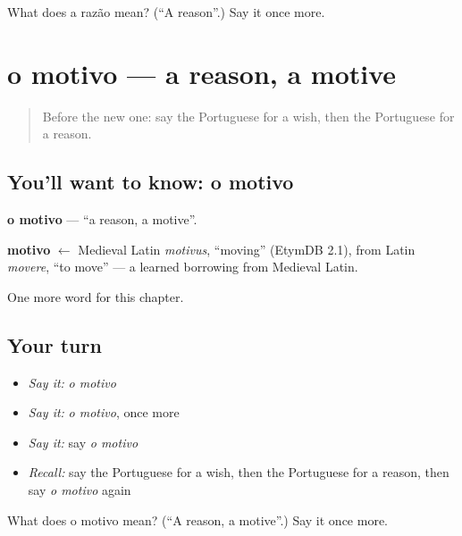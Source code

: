 \begin{tcolorbox}[breakable,colback=teal!4,colframe=teal!35!black,title={Before you move on}]
What does a razão mean? (\textquotedblleft{}A reason\textquotedblright{}.) Say it once more.
\end{tcolorbox}
\section[o motivo]{o motivo — a reason, a motive}

\label{lesson:PT-C84-motivo}



\begin{quote}
Before the new one: say the Portuguese for a wish, then the Portuguese for a reason.
\end{quote}

\subsection*{You'll want to know: o motivo}
\textbf{o motivo} — \textquotedblleft{}a reason, a motive\textquotedblright{}.

\begin{cousinweb}
\textbf{motivo} $\leftarrow$ Medieval Latin \emph{motivus}, \textquotedblleft{}moving\textquotedblright{} (EtymDB 2.1), from Latin \emph{movere}, \textquotedblleft{}to move\textquotedblright{} — a learned borrowing from Medieval Latin.
\end{cousinweb}

\begin{grammarlens}[title={What you've built}]
One more word for this chapter.
\end{grammarlens}

\subsection*{Your turn}
\begin{itemize}
\raggedright
  \item \emph{Say it:} \emph{o motivo}
  \item \emph{Say it:} \emph{o motivo}, once more
  \item \emph{Say it:} say \emph{o motivo}
  \item \emph{Recall:} say the Portuguese for a wish, then the Portuguese for a reason, then say \emph{o motivo} again
\end{itemize}

\begin{tcolorbox}[breakable,colback=teal!4,colframe=teal!35!black,title={Before you move on}]
What does o motivo mean? (\textquotedblleft{}A reason, a motive\textquotedblright{}.) Say it once more.
\end{tcolorbox}
